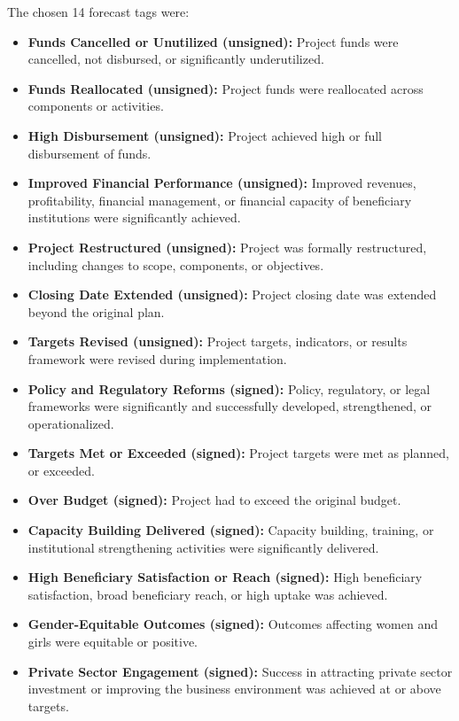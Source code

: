 \documentclass[12pt,a4paper]{article}
\begin{document}
The chosen 14 forecast tags were:
\begin{itemize}
    \item \textbf{Funds Cancelled or Unutilized (unsigned):} Project funds were cancelled, not disbursed, or significantly underutilized.
    \item \textbf{Funds Reallocated (unsigned):} Project funds were reallocated across components or activities.
    \item \textbf{High Disbursement (unsigned):} Project achieved high or full disbursement of funds.
    \item \textbf{Improved Financial Performance (unsigned):} Improved revenues, profitability, financial management, or financial capacity of beneficiary institutions were significantly achieved.
    \item \textbf{Project Restructured (unsigned):} Project was formally restructured, including changes to scope, components, or objectives.
    \item \textbf{Closing Date Extended (unsigned):} Project closing date was extended beyond the original plan.
    \item \textbf{Targets Revised (unsigned):} Project targets, indicators, or results framework were revised during implementation.
    \item \textbf{Policy and Regulatory Reforms (signed):} Policy, regulatory, or legal frameworks were significantly and successfully developed, strengthened, or operationalized.
    \item \textbf{Targets Met or Exceeded (signed):} Project targets were met as planned, or exceeded.
    \item \textbf{Over Budget (signed):} Project had to exceed the original budget.
    \item \textbf{Capacity Building Delivered (signed):} Capacity building, training, or institutional strengthening activities were significantly delivered.
    \item \textbf{High Beneficiary Satisfaction or Reach (signed):} High beneficiary satisfaction, broad beneficiary reach, or high uptake was achieved.
    \item \textbf{Gender-Equitable Outcomes (signed):} Outcomes affecting women and girls were equitable or positive.
    \item \textbf{Private Sector Engagement (signed):} Success in attracting private sector investment or improving the business environment was achieved at or above targets.
\end{itemize}
\end{document}

